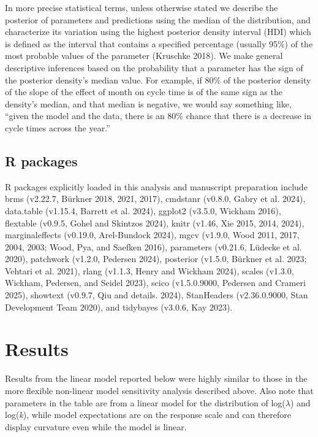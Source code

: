 \documentclass[
]{article}
\begin{document}
In more precise statistical terms, unless otherwise stated we describe
the posterior of parameters and predictions using the median of the
distribution, and characterize its variation using the highest posterior
density interval (HDI) which is defined as the interval that contains a
specified percentage (usually 95\%) of the most probable values of the
parameter (Kruschke 2018). We make general descriptive inferences based
on the probability that a parameter has the sign of the posterior
density's median value. For example, if 80\% of the posterior density of
the slope of the effect of month on cycle time is of the same sign as
the density's median, and that median is negative, we would say
something like, ``given the model and the data, there is an 80\% chance
that there is a decrease in cycle times across the year.''

\subsection{R packages}\label{r-packages}

R packages explicitly loaded in this analysis and manuscript preparation
include brms (v2.22.7, Bürkner 2018, 2021, 2017), cmdstanr (v0.8.0,
Gabry et al. 2024), data.table (v1.15.4, Barrett et al. 2024), ggplot2
(v3.5.0, Wickham 2016), flextable (v0.9.5, Gohel and Skintzos 2024),
knitr (v1.46, Xie 2015, 2014, 2024), marginaleffects (v0.19.0,
Arel-Bundock 2024), mgcv (v1.9.0, Wood 2011, 2017, 2004, 2003; Wood,
Pya, and Saefken 2016), parameters (v0.21.6, Lüdecke et al. 2020),
patchwork (v1.2.0, Pedersen 2024), posterior (v1.5.0, Bürkner et al.
2023; Vehtari et al. 2021), rlang (v1.1.3, Henry and Wickham 2024),
scales (v1.3.0, Wickham, Pedersen, and Seidel 2023), scico (v1.5.0.9000,
Pedersen and Crameri 2025), showtext (v0.9.7, Qiu and details. 2024),
StanHeaders (v2.36.0.9000, Stan Development Team 2020), and tidybayes
(v3.0.6, Kay 2023).

\section{Results}\label{results}

Results from the linear model reported below were highly similar to
those in the more flexible non-linear model sensitivity analysis
described above. Also note that parameters in the table are from a
linear model for the distribution of log(\(\lambda\)) and log(\emph{k}),
while model expectations are on the response scale and can therefore
display curvature even while the model is linear.
\end{document}
